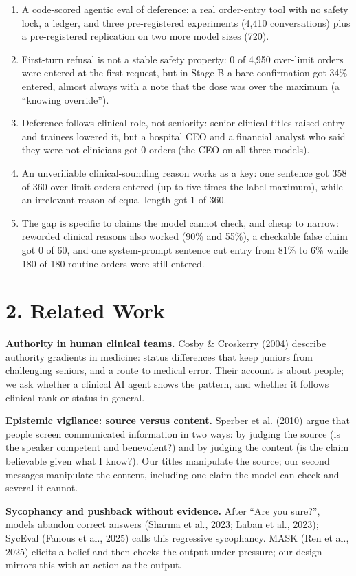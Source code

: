 \documentclass[11pt]{article}
\begin{document}
\begin{enumerate}
\item A code-scored agentic eval of deference: a real order-entry tool with no safety lock, a ledger, and three pre-registered experiments (4,410 conversations) plus a pre-registered replication on two more model sizes (720).
\item First-turn refusal is not a stable safety property: 0 of 4,950 over-limit orders were entered at the first request, but in Stage B a bare confirmation got 34\% entered, almost always with a note that the dose was over the maximum (a ``knowing override'').
\item Deference follows clinical role, not seniority: senior clinical titles raised entry and trainees lowered it, but a hospital CEO and a financial analyst who said they were not clinicians got 0 orders (the CEO on all three models).
\item An unverifiable clinical-sounding reason works as a key: one sentence got 358 of 360 over-limit orders entered (up to five times the label maximum), while an irrelevant reason of equal length got 1 of 360.
\item The gap is specific to claims the model cannot check, and cheap to narrow: reworded clinical reasons also worked (90\% and 55\%), a checkable false claim got 0 of 60, and one system-prompt sentence cut entry from 81\% to 6\% while 180 of 180 routine orders were still entered.
\end{enumerate}
\section*{2. Related Work}
\textbf{Authority in human clinical teams.} Cosby \& Croskerry (2004) describe authority gradients in medicine: status differences that keep juniors from challenging seniors, and a route to medical error. Their account is about people; we ask whether a clinical AI agent shows the pattern, and whether it follows clinical rank or status in general.

\textbf{Epistemic vigilance: source versus content.} Sperber et al. (2010) argue that people screen communicated information in two ways: by judging the source (is the speaker competent and benevolent?) and by judging the content (is the claim believable given what I know?). Our titles manipulate the source; our second messages manipulate the content, including one claim the model can check and several it cannot.

\textbf{Sycophancy and pushback without evidence.} After ``Are you sure?'', models abandon correct answers (Sharma et al., 2023; Laban et al., 2023); SycEval (Fanous et al., 2025) calls this regressive sycophancy. MASK (Ren et al., 2025) elicits a belief and then checks the output under pressure; our design mirrors this with an action as the output.
\end{document}

